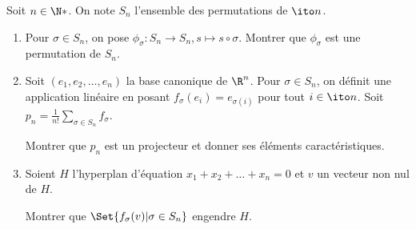 \begin{enonce}
\begin{exercise}[ID={RMS126 E756},subtitle={Centrale PSI 2015},tags={}]
Soit $n\in\N*$.
On note $S_n$ l'ensemble des permutations de $\ito n$.
\begin{enumerate}
  \item Pour $\sigma\in S_n$, on pose $\phi_\sigma:S_n\to S_n, s\mapsto s\circ \sigma$.
    Montrer que $\phi_\sigma$ est une permutation de $S_n$.

  \item Soit $(e_1,e_2,\dots,e_n)$ la base canonique de $\R^n$.
    Pour $\sigma\in S_n$, on définit une application linéaire en posant $f_\sigma(e_i) = e_{\sigma(i)}$ pour tout $i\in\ito n$.
    Soit $p_n=\frac{1}{n!}\sum_{\sigma\in S_n} f_\sigma$.

    Montrer que $p_n$ est un projecteur et donner ses éléments caractéristiques.

  \item Soient $H$ l'hyperplan d'équation $x_1+x_2+\dots+x_n=0$ et $v$ un vecteur non nul de $H$.

    Montrer que $\Set{f_\sigma(v) | \sigma\in S_n}$ engendre $H$.
\end{enumerate}
\end{exercise}
\begin{solution}
\end{solution}
\end{enonce}
